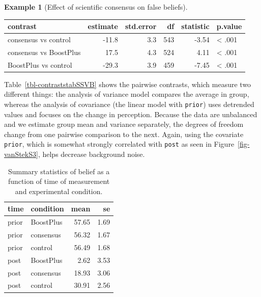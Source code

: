 \documentclass[
  11pt,
  letterpaper,
]{scrbook}
\theoremstyle{definition}
\newtheorem{example}{Example}[chapter]
\theoremstyle{remark}
\begin{document}
\begin{example}[Effect of scientific consensus on false
beliefs]
\begin{table}
\begin{minipage}[t]{\linewidth}
{}

\end{minipage}%
\newline
\begin{minipage}[t]{\linewidth}

{\centering 

\centering
\begin{tabular}[t]{lrrrrl}
\toprule
contrast & estimate & std.error & df & statistic & p.value\\
\midrule
consensus vs control & -11.8 & 3.3 & 543 & -3.54 & < .001\\
consensus vs BoostPlus & 17.5 & 4.3 & 524 & 4.11 & < .001\\
BoostPlus vs control & -29.3 & 3.9 & 459 & -7.45 & < .001\\
\bottomrule
\end{tabular}

}

\end{minipage}%

\end{table}

Table~\ref{tbl-contraststabSSVB} shows the pairwise contrasts, which
measure two different things: the analysis of variance model compares
the average in group, whereas the analysis of covariance (the linear
model with \texttt{prior}) uses detrended values and focuses on the
change in perception. Because the data are unbalanced and we estimate
group mean and variance separately, the degrees of freedom change from
one pairwise comparison to the next. Again, using the covariate
\texttt{prior}, which is somewhat strongly correlated with \texttt{post}
as seen in Figure~\ref{fig-vanStekS3}, helps decrease background noise.

\hypertarget{tbl-vanStekS3}{}
\begin{table}
\caption{\label{tbl-vanStekS3}Summary statistics of belief as a function of time of measurement and
experimental condition. }\tabularnewline

\centering
\begin{tabular}{llrr}
\toprule
time & condition & mean & se\\
\midrule
prior & BoostPlus & 57.65 & 1.69\\
prior & consensus & 56.32 & 1.67\\
prior & control & 56.49 & 1.68\\
post & BoostPlus & 2.62 & 3.53\\
post & consensus & 18.93 & 3.06\\
\addlinespace
post & control & 30.91 & 2.56\\
\bottomrule
\end{tabular}
\end{table}


\end{example}
\end{document}
